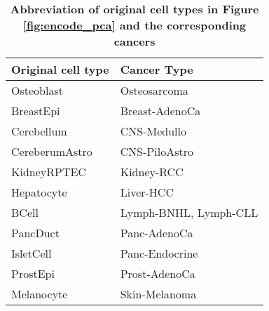 \begin{table}[hp!]
\centering
\caption{\textbf{Abbreviation of original cell types in Figure \ref{fig:encode_pca} and the corresponding cancers}}
\label{tab:encode_pca}
\begin{tabulary}{\textwidth}{ ll }
\toprule
\textbf{Original cell type} & \bf{Cancer Type}  \\
\toprule
Osteoblast & Osteosarcoma \\

BreastEpi & Breast-AdenoCa \\

Cerebellum &  CNS-Medullo  \\

CereberumAstro & CNS-PiloAstro \\

KidneyRPTEC & Kidney-RCC \\

Hepatocyte & Liver-HCC \\

BCell & Lymph-BNHL, Lymph-CLL \\

PancDuct & Panc-AdenoCa \\

IsletCell & Panc-Endocrine \\

ProstEpi & Prost-AdenoCa \\

Melanocyte & Skin-Melanoma \\
\bottomrule

\end{tabulary}
\end{table}

